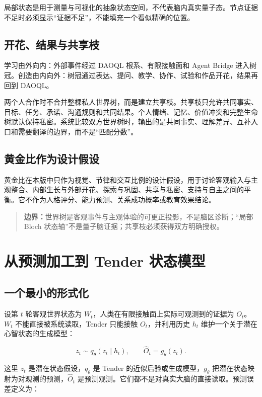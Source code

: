 \documentclass[UTF8,a4paper,11pt]{ctexart}
\newcommand{\boundary}[1]{\begin{quote}\noindent\textbf{\color{TenderPink}边界：}#1\end{quote}}
\begin{document}
局部状态是用于测量与可视化的抽象状态空间，不代表脑内真实量子态。节点证据不足时必须显示“证据不足”，不能填充一个看似精确的位置。

\subsection{开花、结果与共享枝}

学习由外向内：外部事件经过 DAOQL 根系、有限接触面和 Agent Bridge 进入树冠。创造由内向外：树冠通过表达、提问、教学、协作、试验和作品开花，结果再回到 DAOQL。

两个人合作时不合并整棵私人世界树，而是建立共享枝。共享枝只允许共同事实、目标、任务、承诺、沟通规则和共同结果。个人情绪、记忆、价值冲突和完整生命树默认保持私密。系统比较双方世界树时，输出的是共同事实、理解差异、互补入口和需要翻译的边界，而不是“匹配分数”。

\subsection{黄金比作为设计假设}

黄金比在本版中只作为视觉、节律和交互比例的设计假设，用于讨论客观输入与主观整合、内部生长与外部开花、探索与巩固、共享与私密、支持与自主之间的平衡。它不作为人格评分、能力预测、关系成功概率或教育效果结论。

\boundary{世界树是客观事件与主观体验的可更正投影，不是脑区诊断；“局部 Bloch 状态轴”不是量子脑证据；共享枝必须获得双方明确授权。}

\section{从预测加工到 Tender 状态模型}

\subsection{一个最小的形式化}

设第 \(t\) 轮客观世界状态为 \(W_t\)，人类在有限接触面上实际可观测到的证据为 \(O_t\)。\(W_t\) 不能直接被系统读取，Tender 只能接触 \(O_t\)，并利用历史 \(h_t\) 维护一个关于潜在心智状态的生成模型：

\begin{equation}
z_t \sim q_\theta(z_t\mid h_t),\qquad
\hat O_t=g_\theta(z_t).
\end{equation}

这里 \(z_t\) 是潜在状态假设，\(q_\theta\) 是 Tender 的近似后验或生成模型，\(g_\theta\) 把潜在状态映射为对观测的预测，\(\hat O_t\) 是预测观测。它们都不是对真实大脑的直接读取。预测误差定义为：
\end{document}
